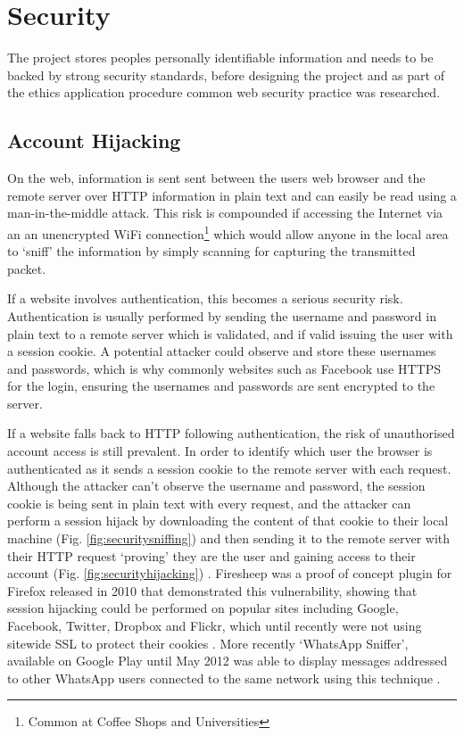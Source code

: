 \section{Security}
The project stores peoples personally identifiable information and needs to be backed by strong security standards, before designing the project and as part of the ethics application procedure common web security practice was researched.

\subsection{Account Hijacking} \label{subsection:account-hijacking}
On the web, information is sent sent between the users web browser and the remote server over HTTP information in plain text and can easily be read using a man-in-the-middle attack. This risk is compounded if accessing the Internet via an an unencrypted WiFi connection\footnote{Common at Coffee Shops and Universities} which would allow anyone in the local area to `sniff' the information by simply scanning for capturing the transmitted packet.

If a website involves authentication, this becomes a serious security risk. Authentication is usually performed by sending the username and password in plain text to a remote server which is validated, and if valid issuing the user with a session cookie.
%
A potential attacker could observe and store these usernames and passwords, which is why commonly websites such as Facebook use HTTPS for the login, ensuring the usernames and passwords are sent encrypted to the server.

If a website falls back to HTTP following authentication, the risk of unauthorised account access is still prevalent.
%
In order to identify which user the browser is authenticated as it sends a session cookie to the remote server with each request. 
%
Although the attacker can't observe the username and password, the session cookie is being sent in plain text with every request, and the attacker can perform a session hijack by downloading the content of that cookie to their local machine (Fig. \ref{fig:securitysniffing}) and then sending it to the remote server with their HTTP request `proving' they are the user and gaining access to their account (Fig. \ref{fig:securityhijacking}) \parencite{owasp2011sessionhihacking}.
% 
Firesheep was a proof of concept plugin for Firefox released in 2010 that demonstrated this vulnerability, showing that session hijacking could be performed on popular sites including Google, Facebook, Twitter, Dropbox and Flickr, which until recently were not using sitewide SSL to protect their cookies \parencite{butler2010firesheep, butler2014firesheep}. 
%
More recently `WhatsApp Sniffer', available on Google Play until May 2012 was able to display messages addressed to other WhatsApp users connected to the same network using this technique \parencite{thehsecurity2012whatsapp}.

